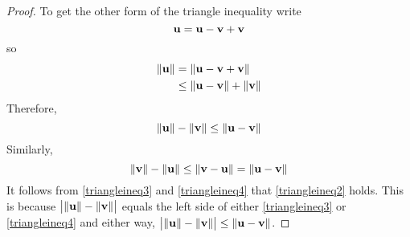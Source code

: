 \begin{proof}
To get the other form of the triangle inequality write 
\begin{equation*}
{\bf u}={\bf u}-{\bf v}+{\bf v}
\end{equation*}
so
\begin{align*}
\|{\bf u}\| & =\|{\bf u}-{\bf v}+{\bf v}\| \\
& \leq \|{\bf u}-{\bf v}\| +\|{\bf v}\| 
\end{align*}
Therefore,
\begin{equation}
\|{\bf u}\| -\|{\bf v}\| \leq \|{\bf u}-{\bf v}
\|  \label{triangleineq3}
\end{equation}
Similarly,
\begin{equation}
\|{\bf v}\| -\|{\bf u}\| \leq \|{\bf v}-{\bf u}
\| =\|{\bf u}-{\bf v}\|  \label{triangleineq4}
\end{equation}
It follows from \ref{triangleineq3} and \ref{triangleineq4} that \ref{triangleineq2} holds. This
is because $\big| \|{\bf u}\| -\|{\bf v}\|
\big| $ equals the left side of either \ref{triangleineq3} or \ref{triangleineq4} and
either way, $\big| \|{\bf u}\| -\|{\bf v}\|
\big| \leq \|{\bf u}-{\bf v}\| $. 
\end{proof}